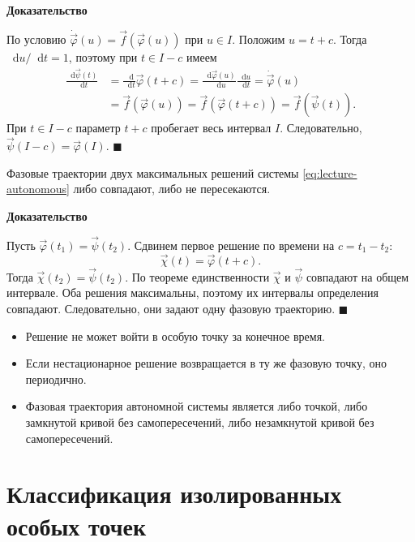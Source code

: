 \documentclass[12pt,a4paper]{article}
\numberwithin{equation}{section}
\newcommand{\vect}[1]{\vec{#1}}
\newcommand{\dd}{\mathop{}\!\mathrm{d}}
\renewenvironment{proof}[1][Доказательство]{\begin{center}\textbf{#1}\end{center}}{\hfill$\blacksquare$\par}
\DeclareRobustCommand{\examtag}[1]{\space{\normalfont\small\color{HSEgray}(#1)}}
\begin{document}
\begin{proof}
По условию $\dot{\vect\varphi}(u)=\vect f(\vect\varphi(u))$ при $u\in I$.
Положим $u=t+c$. Тогда $\dd u/\dd t=1$, поэтому при $t\in I-c$ имеем
\[
 \begin{aligned}
 \frac{\dd\vect\psi(t)}{\dd t}
 &=\frac{\dd}{\dd t}\vect\varphi(t+c)
 =\frac{\dd\vect\varphi(u)}{\dd u}\frac{\dd u}{\dd t}
 =\dot{\vect\varphi}(u)\\
 &=\vect f(\vect\varphi(u))=\vect f(\vect\varphi(t+c))
 =\vect f(\vect\psi(t)).
 \end{aligned}
\]
При $t\in I-c$ параметр $t+c$ пробегает весь интервал $I$.
Следовательно, $\vect\psi(I-c)=\vect\varphi(I)$.
\end{proof}


\begin{theoremHSE}
Фазовые траектории двух максимальных решений системы \eqref{eq:lecture-autonomous} либо совпадают, либо не пересекаются.
\end{theoremHSE}

\begin{proof}
Пусть $\vect{\varphi}(t_1)=\vect{\psi}(t_2)$. Сдвинем первое решение по времени на $c=t_1-t_2$:
\[
\vect{\chi}(t)=\vect{\varphi}(t+c).
\]
Тогда $\vect{\chi}(t_2)=\vect{\psi}(t_2)$. По теореме единственности $\vect{\chi}$ и $\vect{\psi}$ совпадают на общем интервале. Оба решения максимальны, поэтому их интервалы определения совпадают. Следовательно, они задают одну фазовую траекторию.
\end{proof}

\begin{corollaryHSE}[Следствия]
\begin{itemize}
  \item Решение не может войти в особую точку за конечное время.
  \item Если нестационарное решение возвращается в ту же фазовую точку, оно периодично.
  \item Фазовая траектория автономной системы является либо точкой, либо замкнутой кривой без самопересечений, либо незамкнутой кривой без самопересечений.
\end{itemize}
\end{corollaryHSE}

\section{Классификация изолированных особых точек\examtag{вопрос~26}}
\end{document}
